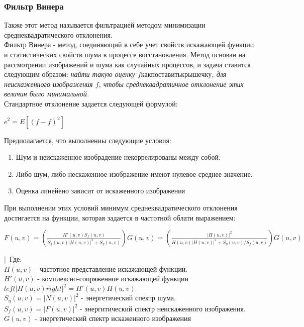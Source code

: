 \documentclass{article}
\begin{document}
	\subsubsection{Фильтр Винера}
	Также этот метод называется фильтрацией методом минимизации среднеквадратического отклонения.\\
	Фильтр Винера - метод, соединяющий в себе учет свойств искажающей функции и статистических свойств шума в процессе восстановления. Метод основан на рассмотрении изображений и шума как случайных процессов, и задача ставится следующим образом: \textit{ найти такую оценку  $f как поставить крышечку $, для неискаженного изображения $f$, чтобы среднеквадратичное отклонение этих величин было минимальной.}\\
	Стандартное отклонение задается следующей формулой:
	\begin{center}
		$e^2=E\left[ (f- f)^2 \right]  $
	\end{center}
	Предполагается, что выполнениы следующие условия: 
	\begin{enumerate}
		\item Шум и неискаженное изобрадение некоррелированы между собой.
		\item Либо шум, либо нескаженное изображение имеют нулевое среднее значение.
		\item Оценка линейено зависит от искаженного изображения
	\end{enumerate}
	При выполнении этих условий минимум среднеквадратического отклонения достигается на функции, которая задается в частотной облати выражением:
	\begin{center}
		$F(u, v)=\left( \frac{H'(u, v)S_f(u, v)}{S_f(u, v) \left| H(u, v)\right|^2 +S_\eta(u,v) } \right) G(u,v)=\left( \frac{\left| H(u, v) \right|^2}{H(u, v) \left| H(u, v)\right|^2 +S_\eta(u,v) / S_f(u,v)} \right) G(u,v)$
	\end{center}|\
	Где:\\
	$H(u, v)$ - частотное представление искажающей функции.\\
	$H'(u, v)$ - комплексно-сопряженное искажающей функции\\
	$left| H(u, v) right|^2=H'(u,v)H(u, v)$\\
	$S_\eta(u, v) =\left| N(u ,v) \right|^2$ - энергетический спектр шума.\\
	$S_f(u, v)=\left| F(u, v) \right |^2$ - энергитический спектр неискаженного изображения.\\
	$G(u, v)$ - энергетический спектр искаженного изображения\\ \\
\end{document}
